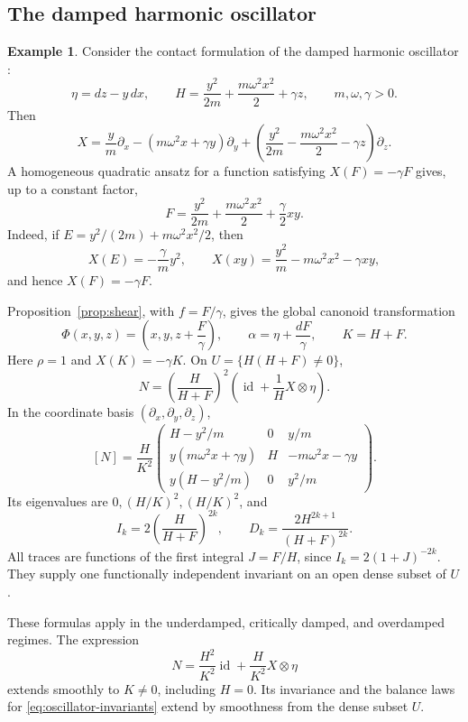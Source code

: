 \documentclass[11pt,a4paper]{article}
\numberwithin{equation}{section}
\theoremstyle{definition}
\newtheorem{example}{Example}
\theoremstyle{remark}
\newcommand{\id}{\operatorname{id}}
\begin{document}
\subsection{The damped harmonic oscillator}

\begin{example}
Consider the contact formulation of the damped
harmonic oscillator \cite{Bravetti2017,GGMRR2020}:
\[
\eta=dz-y\,dx,\qquad
H=\frac{y^2}{2m}+\frac{m\omega^2x^2}{2}+\gamma z,
\qquad m,\omega,\gamma>0.
\]
Then
\[
X=\frac ym\partial_x-(m\omega^2x+\gamma y)\partial_y
+\left(\frac{y^2}{2m}-\frac{m\omega^2x^2}{2}
-\gamma z\right)\partial_z.
\]
A homogeneous quadratic ansatz for a function satisfying
$X(F)=-\gamma F$ gives, up to a constant factor,
\[
F=\frac{y^2}{2m}+\frac{m\omega^2x^2}{2}
+\frac{\gamma}{2}xy.
\]
Indeed, if $E=y^2/(2m)+m\omega^2x^2/2$, then
\[
X(E)=-\frac{\gamma}{m}y^2,\qquad
X(xy)=\frac{y^2}{m}-m\omega^2x^2-\gamma xy,
\]
and hence $X(F)=-\gamma F$.

Proposition~\ref{prop:shear}, with $f=F/\gamma$,
gives the global canonoid transformation
\[
\Phi(x,y,z)=\left(x,y,z+\frac F\gamma\right),
\qquad
\alpha=\eta+\frac{dF}{\gamma},
\qquad
K=H+F.
\]
Here $\rho=1$ and $X(K)=-\gamma K$.
On $U=\{H(H+F)\neq0\}$,
\begin{equation}
N=\left(\frac{H}{H+F}\right)^2
\left(\id+\frac1H X\otimes\eta\right).
\label{eq:oscillator-N}
\end{equation}
In the coordinate basis $(\partial_x,\partial_y,\partial_z)$,
\[
[N]=\frac{H}{K^2}
\begin{pmatrix}
H-y^2/m&0&y/m\\
y(m\omega^2x+\gamma y)&H&-m\omega^2x-\gamma y\\
y(H-y^2/m)&0&y^2/m
\end{pmatrix}.
\]
Its eigenvalues are $0,(H/K)^2,(H/K)^2$, and
\begin{equation}
I_k=2\left(\frac{H}{H+F}\right)^{2k},
\qquad
D_k=\frac{2H^{2k+1}}{(H+F)^{2k}}.
\label{eq:oscillator-invariants}
\end{equation}
All traces are functions of the first integral
$J=F/H$, since $I_k=2(1+J)^{-2k}$.
They supply one functionally independent invariant
on an open dense subset of $U$.

These formulas apply in the underdamped, critically
damped, and overdamped regimes. The expression
\[
N=\frac{H^2}{K^2}\id+\frac{H}{K^2}X\otimes\eta
\]
extends smoothly to $K\neq0$, including $H=0$.
Its invariance and the balance laws for
\eqref{eq:oscillator-invariants} extend by smoothness
from the dense subset $U$.
\end{example}
\end{document}
